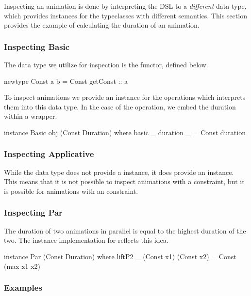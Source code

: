 Inspecting an animation is done by interpreting the DSL to a \emph{different} data type, which provides instances for the typeclasses with different semantics. This section provides the example of calculating the duration of an animation.

\subsubsection{Inspecting Basic}

The data type we utilize for inspection is the  functor, defined below.

\begin{spec}
newtype Const a b = Const { getConst :: a }
\end{spec}

To inspect animations we provide an instance for the operations which interprets them into this data type. In the case of the  operation, we embed the duration within a  wrapper.

\begin{code}
instance Basic obj (Const Duration) where
  basic _ duration _ = Const duration
\end{code}

\subsubsection{Inspecting Applicative}

While the  data type does not provide a  instance, it does provide an  instance. This means that it is not possible to inspect animations with a  constraint, but it is possible for animations with an  constraint.

\subsubsection{Inspecting Par}

The duration of two animations in parallel is equal to the highest duration of the two. The  instance implementation for  reflects this idea. 

\begin{code}
instance Par (Const Duration) where
  liftP2 _ (Const x1) (Const x2) = Const (max x1 x2)
\end{code}

\subsubsection{Examples}


